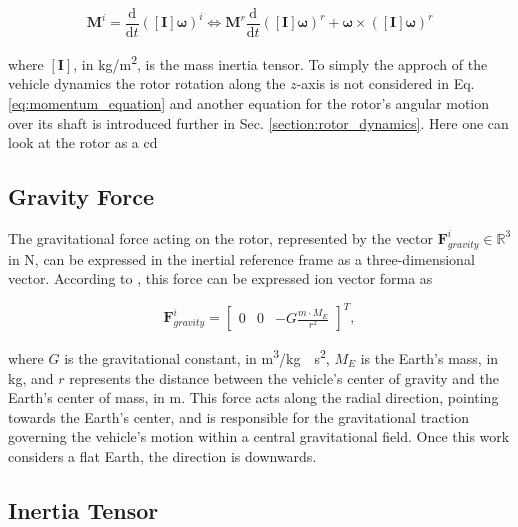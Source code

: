 \begin{equation}
    \mathbf{M}^i = \frac{\mathrm{d}}{\mathrm{d}t} \left( \left[\mathbf{I}\right] \boldsymbol{\omega} \right)^i \Leftrightarrow  \mathbf{M}^r\frac{\mathrm{d}}{\mathrm{d}t} \left( \left[\mathbf{I}\right] \boldsymbol{\omega} \right)^r + \boldsymbol{\omega} \times \left( \left[\mathbf{I}\right] \boldsymbol{\omega} \right)^r
    \label{eq:momentum_equation}
\end{equation}

where $\left[\mathbf{I}\right]$, in \unit{kg/m^2}, is the mass inertia tensor. To simply the approch of the vehicle dynamics the rotor rotation along the $z$-axis is not considered in Eq. \ref{eq:momentum_equation} and another equation for the rotor's angular motion over its shaft is introduced further in Sec. \ref{section:rotor_dynamics}. Here one can look at the rotor as a \gls{cd}



\subsection{Gravity Force}

The gravitational force acting on the rotor, represented by the vector \(\mathbf{F}_{gravity}^i \in \mathbb{R}^3\) in \unit{N}, can be expressed in the inertial reference frame as a three-dimensional vector. According to \cite{curtis_orbital_2008}, this force can be expressed ion vector forma as 

\begin{equation}
    \mathbf{F}_{gravity}^i = 
    \begin{bmatrix}
        0 & 0 & -G \frac{m \cdot M_E}{r^2}
    \end{bmatrix}^T,
\end{equation}  

where $G$ is the gravitational constant, in \unit{m^3/kg \cdot s^2}, $M_E$ is the Earth's mass, in \unit{kg}, and $r$ represents the distance between the vehicle's center of gravity and the Earth's center of mass, in \unit{m}. This force acts along the radial direction, pointing towards the 
Earth's center, and is responsible for the gravitational traction governing the vehicle's motion within a central gravitational field. Once this work considers a flat Earth, the direction is downwards.


\subsection{Inertia Tensor}

